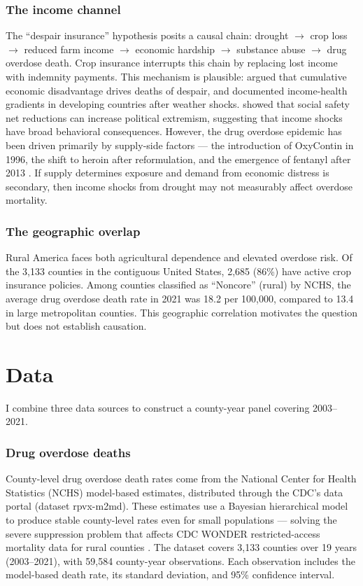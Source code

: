 \documentclass[12pt]{article}
\begin{document}
\subsubsection*{The income channel} The ``despair insurance'' hypothesis posits a causal chain: drought $\rightarrow$ crop loss $\rightarrow$ reduced farm income $\rightarrow$ economic hardship $\rightarrow$ substance abuse $\rightarrow$ drug overdose death. Crop insurance interrupts this chain by replacing lost income with indemnity payments. This mechanism is plausible: \citet{case2020deaths} argued that cumulative economic disadvantage drives deaths of despair, and \citet{dow1997health} documented income-health gradients in developing countries after weather shocks. \citet{fetzer2020subsidizing} showed that social safety net reductions can increase political extremism, suggesting that income shocks have broad behavioral consequences. However, the drug overdose epidemic has been driven primarily by supply-side factors --- the introduction of OxyContin in 1996, the shift to heroin after reformulation, and the emergence of fentanyl after 2013 \citep{alpert2022origins, evans2019opioid, ruhm2019drivers}. If supply determines exposure and demand from economic distress is secondary, then income shocks from drought may not measurably affect overdose mortality.

\subsubsection*{The geographic overlap} Rural America faces both agricultural dependence and elevated overdose risk. Of the 3,133 counties in the contiguous United States, 2,685 (86\%) have active crop insurance policies. Among counties classified as ``Noncore'' (rural) by NCHS, the average drug overdose death rate in 2021 was 18.2 per 100,000, compared to 13.4 in large metropolitan counties. This geographic correlation motivates the question but does not establish causation.

\section{Data}

I combine three data sources to construct a county-year panel covering 2003--2021.

\subsubsection*{Drug overdose deaths} County-level drug overdose death rates come from the National Center for Health Statistics (NCHS) model-based estimates, distributed through the CDC's data portal (dataset rpvx-m2md). These estimates use a Bayesian hierarchical model to produce stable county-level rates even for small populations --- solving the severe suppression problem that affects CDC WONDER restricted-access mortality data for rural counties \citep{rossen2020county}. The dataset covers 3,133 counties over 19 years (2003--2021), with 59,584 county-year observations. Each observation includes the model-based death rate, its standard deviation, and 95\% confidence interval.
\end{document}
